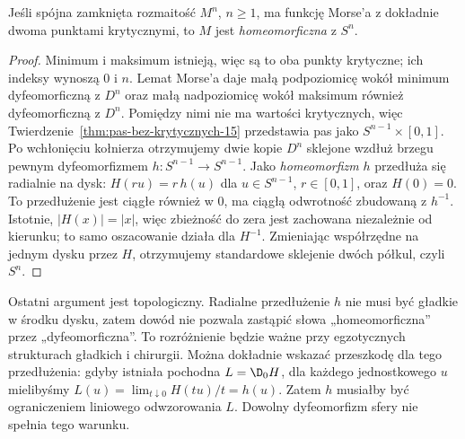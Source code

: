 \begin{twierdzenie}
\label{thm:reeb-morse-17}
Jeśli spójna zamknięta rozmaitość
$M^n$, $n\geq1$, ma funkcję
Morse'a z dokładnie dwoma
punktami krytycznymi, to
$M$ jest \emph{homeomorficzna}
z $S^n$.
\end{twierdzenie}
\begin{proof}
Minimum i maksimum istnieją,
więc są to oba punkty krytyczne;
ich indeksy wynoszą $0$ i $n$.
Lemat Morse'a daje małą
podpoziomicę wokół minimum
dyfeomorficzną z $D^n$ oraz
małą nadpoziomicę wokół maksimum
również dyfeomorficzną z $D^n$.
Pomiędzy nimi nie ma wartości
krytycznych, więc
Twierdzenie~\ref{thm:pas-bez-krytycznych-15}
przedstawia pas jako
$S^{n-1}\times[0,1]$.
Po wchłonięciu kołnierza
otrzymujemy dwie kopie $D^n$
sklejone wzdłuż brzegu
pewnym dyfeomorfizmem
$h:S^{n-1}\to S^{n-1}$.
Jako \emph{homeomorfizm}
$h$ przedłuża się radialnie
na dysk:
$H(ru)=r\,h(u)$ dla
$u\in S^{n-1}$, $r\in[0,1]$,
oraz $H(0)=0$.
To przedłużenie jest ciągłe
również w $0$, ma ciągłą
odwrotność zbudowaną z $h^{-1}$.
Istotnie, $|H(x)|=|x|$, więc zbieżność do zera jest zachowana
niezależnie od kierunku; to samo oszacowanie działa dla $H^{-1}$.
Zmieniając współrzędne
na jednym dysku przez $H$,
otrzymujemy standardowe
sklejenie dwóch półkul,
czyli $S^n$.
\end{proof}

\begin{uwaga}
Ostatni argument jest topologiczny.
Radialne przedłużenie $h$ nie musi być
gładkie w środku dysku, zatem dowód
nie pozwala zastąpić słowa
„homeomorficzna” przez
„dyfeomorficzna”. To rozróżnienie
będzie ważne przy egzotycznych
strukturach gładkich i chirurgii.
Można dokładnie wskazać przeszkodę dla tego przedłużenia:
gdyby istniała pochodna $L=\D_0H$, dla każdego jednostkowego $u$
mielibyśmy $L(u)=\lim_{t\downarrow0}H(tu)/t=h(u)$.
Zatem $h$ musiałby być ograniczeniem liniowego odwzorowania $L$.
Dowolny dyfeomorfizm sfery nie spełnia tego warunku.
\end{uwaga}

